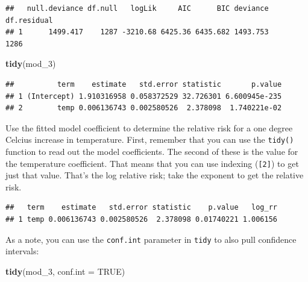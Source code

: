 \documentclass[]{book}
\makeatletter
\newenvironment{Shaded}{\begin{snugshade}}{\end{snugshade}}
\newcommand{\KeywordTok}[1]{\textcolor[rgb]{0.13,0.29,0.53}{\textbf{#1}}}
\newcommand{\DataTypeTok}[1]{\textcolor[rgb]{0.13,0.29,0.53}{#1}}
\newcommand{\DecValTok}[1]{\textcolor[rgb]{0.00,0.00,0.81}{#1}}
\newcommand{\StringTok}[1]{\textcolor[rgb]{0.31,0.60,0.02}{#1}}
\newcommand{\OtherTok}[1]{\textcolor[rgb]{0.56,0.35,0.01}{#1}}
\newcommand{\OperatorTok}[1]{\textcolor[rgb]{0.81,0.36,0.00}{\textbf{#1}}}
\newcommand{\NormalTok}[1]{#1}
\newenvironment{kframe}{%
\medskip{}
\setlength{\fboxsep}{.8em}
 \def\at@end@of@kframe{}%
 \ifinner\ifhmode%
  \def\at@end@of@kframe{\end{minipage}}%
  \begin{minipage}{\columnwidth}%
 \fi\fi%
 \def\FrameCommand##1{\hskip\@totalleftmargin \hskip-\fboxsep
 \colorbox{shadecolor}{##1}\hskip-\fboxsep
     \hskip-\linewidth \hskip-\@totalleftmargin \hskip\columnwidth}%
 \MakeFramed {\advance\hsize-\width
   \@totalleftmargin\z@ \linewidth\hsize
   \@setminipage}}%
 {\par\unskip\endMakeFramed%
 \at@end@of@kframe}
\renewenvironment{Shaded}{\begin{kframe}}{\end{kframe}}
\theoremstyle{definition}
\theoremstyle{definition}
\theoremstyle{definition}
\theoremstyle{remark}
\makeatother
\begin{document}
\begin{verbatim}
##   null.deviance df.null   logLik     AIC      BIC deviance df.residual
## 1      1499.417    1287 -3210.68 6425.36 6435.682 1493.753        1286
\end{verbatim}

\begin{Shaded}
\begin{Highlighting}[]
\KeywordTok{tidy}\NormalTok{(mod_}\DecValTok{3}\NormalTok{)}
\end{Highlighting}
\end{Shaded}

\begin{verbatim}
##          term    estimate   std.error statistic       p.value
## 1 (Intercept) 1.910316958 0.058372529 32.726301 6.600945e-235
## 2        temp 0.006136743 0.002580526  2.378098  1.740221e-02
\end{verbatim}

Use the fitted model coefficient to determine the relative risk for a
one degree Celcius increase in temperature. First, remember that you can
use the \texttt{tidy()} function to read out the model coefficients. The
second of these is the value for the temperature coefficient. That means
that you can use indexing (\texttt{{[}2{]}}) to get just that value.
That's the log relative risk; take the exponent to get the relative
risk.

\begin{Shaded}
\end{Shaded}

\begin{verbatim}
##   term    estimate   std.error statistic    p.value   log_rr
## 1 temp 0.006136743 0.002580526  2.378098 0.01740221 1.006156
\end{verbatim}

As a note, you can use the \texttt{conf.int} parameter in \texttt{tidy}
to also pull confidence intervals:

\begin{Shaded}
\begin{Highlighting}[]
\KeywordTok{tidy}\NormalTok{(mod_}\DecValTok{3}\NormalTok{, }\DataTypeTok{conf.int =} \OtherTok{TRUE}\NormalTok{)}
\end{Highlighting}
\end{Shaded}
\end{document}
